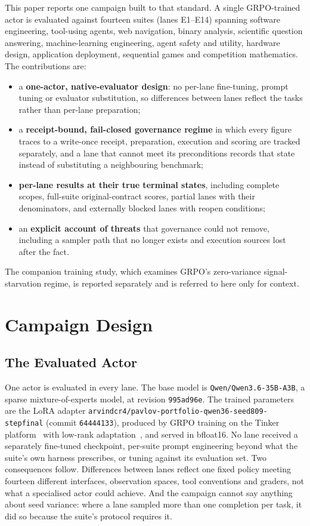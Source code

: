 \documentclass[runningheads]{llncs}
\newcommand{\adapter}{the LoRA adapter \texttt{arvindcr4/pavlov-portfolio-qwen36-seed809-stepfinal} (commit \texttt{64444133})}
\begin{document}
This paper reports one campaign built to that standard. A single GRPO-trained
actor is evaluated against fourteen suites (lanes E1--E14) spanning software
engineering, tool-using agents, web navigation, binary analysis, scientific
question answering, machine-learning engineering, agent safety and utility,
hardware design, application deployment, sequential games and competition
mathematics. The contributions are:
\begin{itemize}
\item a \textbf{one-actor, native-evaluator design}: no per-lane fine-tuning,
prompt tuning or evaluator substitution, so differences between lanes reflect
the tasks rather than per-lane preparation;
\item a \textbf{receipt-bound, fail-closed governance regime} in which every
figure traces to a write-once receipt, preparation, execution and scoring are
tracked separately, and a lane that cannot meet its preconditions records that
state instead of substituting a neighbouring benchmark;
\item \textbf{per-lane results at their true terminal states}, including
complete scopes, full-suite original-contract scores, partial lanes with their
denominators, and externally blocked lanes with reopen conditions;
\item an \textbf{explicit account of threats} that governance could not remove,
including a sampler path that no longer exists and execution sources lost after
the fact.
\end{itemize}
The companion training study, which examines GRPO's zero-variance
signal-starvation regime, is reported separately and is referred to here only
for context.

\section{Campaign Design}

\subsection{The Evaluated Actor}

One actor is evaluated in every lane. The base model is
\texttt{Qwen/Qwen3.6-35B-A3B}, a sparse mixture-of-experts model, at revision
\texttt{995ad96e}. The trained parameters are \adapter, produced by GRPO
training on the Tinker platform~\cite{thinkingmachines2024tinker} with low-rank
adaptation~\cite{hu2022lora}, and served in bfloat16. No lane received a
separately fine-tuned checkpoint, per-suite prompt engineering beyond what the
suite's own harness prescribes, or tuning against its evaluation set.
Two consequences follow. Differences between lanes reflect one fixed policy
meeting fourteen different interfaces, observation spaces, tool conventions
and graders, not what a specialised actor could achieve. And the campaign
cannot say anything about seed variance: where a lane sampled more than one
completion per task, it did so because the suite's protocol requires it.
\end{document}
